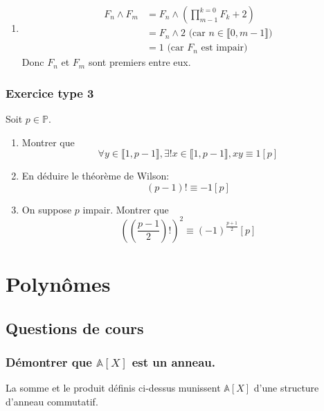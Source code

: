 \documentclass[titlepage, twoside]{report}
\begin{document}
\begin{enumerate}
\begin{enumerate}
        \item \begin{align*}
            F_n \wedge F_m &= F_n \wedge \left( \prod_{m-1}^{k=0} F_k + 2 \right) \\
            &= F_n \wedge 2 \text{ (car $n \in \llbracket 0, m-1 \rrbracket$)} \\
            &= 1 \text{ (car $F_n$ est impair)}
        \end{align*}
        Donc $F_n$ et $F_m$ sont premiers entre eux. 
    \end{enumerate}
\end{enumerate}


\subsubsection{Exercice type 3}
\begin{tcolorbox}[title=Exercice 3, title filled=false, colframe=darkgreen, colback=darkgreen!10!white]
    Soit $p \in \mathbb{P}$.
    \begin{enumerate}
        \item Montrer que
        $$\forall y \in \llbracket 1, p-1 \rrbracket, \exists!x \in \llbracket 1, p-1 \rrbracket, x y \equiv 1[p]$$

        \item En déduire le théorème de Wilson:
        $$(p-1)!\equiv-1[p]$$

        \item On suppose $p$ impair. Montrer que
        $$\left(\left(\frac{p-1}{2}\right)!\right)^2 \equiv(-1)^{\frac{p+1}{2}}[p]$$
    \end{enumerate}
\end{tcolorbox}


\section{Polynômes}
\subsection{Questions de cours}
\subsubsection{Démontrer que $\mathbb{A}[X]$ est un anneau. }
\begin{tcolorbox}[title=Théorème 13.7, title filled=false, colframe=orange, colback=orange!10!white]
    La somme et le produit définis ci-dessus munissent $\mathbb{A}[X]$ d'une structure d'anneau commutatif. 
\end{tcolorbox}
\end{document}
